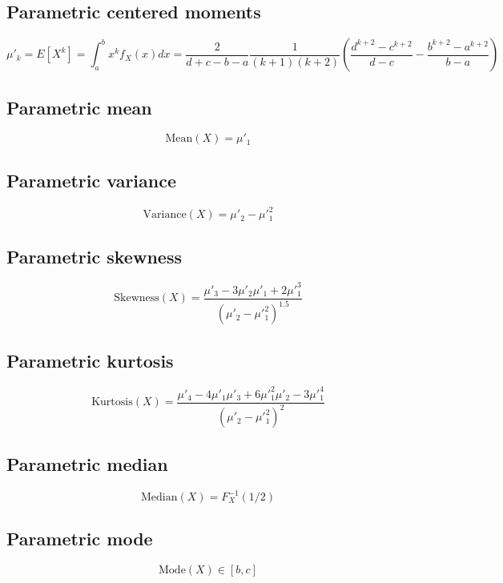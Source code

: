 \documentclass{article}
\begin{document}
\subsection{Parametric centered moments}
\begin{equation*} \mu'_{k}=E[X^k]=\int_{a}^{b}x^{k}f_{X}\left(x\right)dx=\frac{2}{d+c-b-a}\frac{1}{(k+1)(k+2)}\left(\frac{d^{k+2}-c^{k+2}}{d-c}-\frac{b^{k+2}-a^{k+2}}{b-a}\right) \end{equation*}
\subsection{Parametric mean}
\begin{equation*} \mathrm{Mean}(X)=\mu'_{1} \end{equation*}
\subsection{Parametric variance}
\begin{equation*} \mathrm{Variance}(X)=\mu'_{2}-\mu'^{2}_{1} \end{equation*}
\subsection{Parametric skewness}
\begin{equation*} \mathrm{Skewness}(X)=\frac{\mu'_{3}-3\mu'_{2}\mu'_{1}+2\mu'^{3}_{1}}{(\mu'_{2}-\mu'^{2}_{1})^{1.5}} \end{equation*}
\subsection{Parametric kurtosis}
\begin{equation*} \mathrm{Kurtosis}(X)=\frac{\mu'_{4}-4\mu'_{1}\mu'_{3}+6\mu'^{2}_{1}\mu'_{2}-3\mu'^{4}_{1}}{(\mu'_{2}-\mu'^{2}_{1})^{2}} \end{equation*}
\subsection{Parametric median}
\begin{equation*} \mathrm{Median}(X)=F^{-1}_{X}\left(1/2\right) \end{equation*}
\subsection{Parametric mode}
\begin{equation*} \mathrm{Mode}(X)\in [b,c] \end{equation*}
\end{document}
